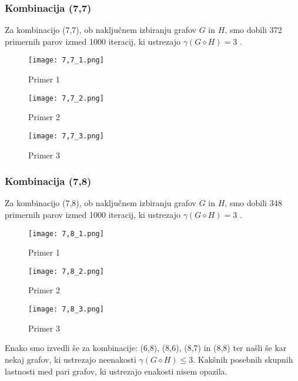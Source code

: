 \documentclass[a4paper,12pt]{article}
\theoremstyle{definition}
\begin{document}
\newpage
\subsubsection{Kombinacija (7,7)}
\noindent Za kombinacijo (7,7), ob naključnem izbiranju grafov $G$ in $H$, smo dobili 372 primernih parov izmed 1000 iteracij, ki ustrezajo $\gamma(G \diamond H) = 3$ .

\begin{figure}[H]
\centering
\texttt{[image: 7,7\_1.png]}
\caption{Primer 1}
\end{figure}

\begin{figure}[H]
\centering
\texttt{[image: 7,7\_2.png]}
\caption{Primer 2}
\end{figure}

\begin{figure}[H]
\centering
\texttt{[image: 7,7\_3.png]}
\caption{Primer 3}
\end{figure}

\subsubsection{Kombinacija (7,8)}
\noindent Za kombinacijo (7,8), ob naključnem izbiranju grafov $G$ in $H$, smo dobili 348 primernih parov izmed 1000 iteracij, ki ustrezajo $\gamma(G \diamond H) = 3$ .

\begin{figure}[H]
\centering
\texttt{[image: 7,8\_1.png]}
\caption{Primer 1}
\end{figure}

\begin{figure}[H]
\centering
\texttt{[image: 7,8\_2.png]}
\caption{Primer 2}
\end{figure}

\begin{figure}[H]
\centering
\texttt{[image: 7,8\_3.png]}
\caption{Primer 3}
\end{figure}

\noindent Enako smo izvedli še za kombinacije: (6,8), (8,6), (8,7) in (8,8) ter našli še kar nekaj grafov, ki ustrezajo neenakosti $\gamma(G \diamond H) \leq 3$. Kakšnih posebnih skupnih lastnosti med pari grafov, ki ustrezajo enakosti nisem opazila.
\end{document}
